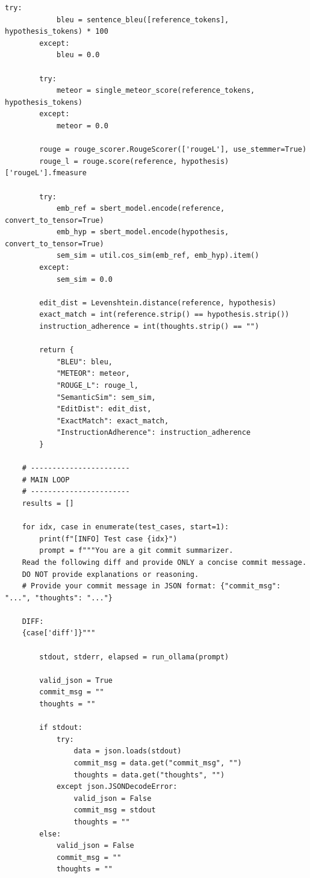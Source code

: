 \documentclass{report}
\begin{document}
\begin{lstlisting}[style=pythonstyle]
        try:
            bleu = sentence_bleu([reference_tokens], hypothesis_tokens) * 100
        except:
            bleu = 0.0

        try:
            meteor = single_meteor_score(reference_tokens, hypothesis_tokens)
        except:
            meteor = 0.0

        rouge = rouge_scorer.RougeScorer(['rougeL'], use_stemmer=True)
        rouge_l = rouge.score(reference, hypothesis)['rougeL'].fmeasure

        try:
            emb_ref = sbert_model.encode(reference, convert_to_tensor=True)
            emb_hyp = sbert_model.encode(hypothesis, convert_to_tensor=True)
            sem_sim = util.cos_sim(emb_ref, emb_hyp).item()
        except:
            sem_sim = 0.0

        edit_dist = Levenshtein.distance(reference, hypothesis)
        exact_match = int(reference.strip() == hypothesis.strip())
        instruction_adherence = int(thoughts.strip() == "")

        return {
            "BLEU": bleu,
            "METEOR": meteor,
            "ROUGE_L": rouge_l,
            "SemanticSim": sem_sim,
            "EditDist": edit_dist,
            "ExactMatch": exact_match,
            "InstructionAdherence": instruction_adherence
        }

    # -----------------------
    # MAIN LOOP
    # -----------------------
    results = []

    for idx, case in enumerate(test_cases, start=1):
        print(f"[INFO] Test case {idx}")
        prompt = f"""You are a git commit summarizer.
    Read the following diff and provide ONLY a concise commit message.
    DO NOT provide explanations or reasoning.
    # Provide your commit message in JSON format: {"commit_msg": "...", "thoughts": "..."}

    DIFF:
    {case['diff']}"""

        stdout, stderr, elapsed = run_ollama(prompt)

        valid_json = True
        commit_msg = ""
        thoughts = ""

        if stdout:
            try:
                data = json.loads(stdout)
                commit_msg = data.get("commit_msg", "")
                thoughts = data.get("thoughts", "")
            except json.JSONDecodeError:
                valid_json = False
                commit_msg = stdout
                thoughts = ""
        else:
            valid_json = False
            commit_msg = ""
            thoughts = ""


\end{lstlisting}
\end{document}
